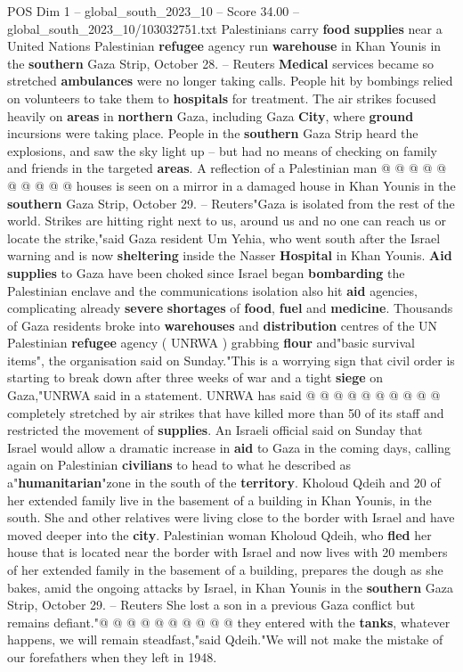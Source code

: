 \begin{textsample}{POS Dim 1 – global\_south\_2023\_10 – Score 34.00 – global\_south\_2023\_10/103032751.txt}
Palestinians carry \textbf{food} \textbf{supplies} near a United Nations Palestinian \textbf{refugee} agency run \textbf{warehouse} in Khan Younis in the \textbf{southern} Gaza Strip, October 28. -- Reuters \textbf{Medical} services became so stretched \textbf{ambulances} were no longer taking calls.
People hit by bombings relied on volunteers to take them to \textbf{hospitals} for treatment.
The air strikes focused heavily on \textbf{areas} in \textbf{northern} Gaza, including Gaza \textbf{City}, where \textbf{ground} incursions were taking place.
People in the \textbf{southern} Gaza Strip heard the explosions, and saw the sky light up -- but had no means of checking on family and friends in the targeted \textbf{areas}.
A reflection of a Palestinian man @ @ @ @ @ @ @ @ @ @ houses is seen on a mirror in a damaged house in Khan Younis in the \textbf{southern} Gaza Strip, October 29. -- Reuters"Gaza is isolated from the rest of the world.
Strikes are hitting right next to us, around us and no one can reach us or locate the strike,"said Gaza resident Um Yehia, who went south after the Israel warning and is now \textbf{sheltering} inside the Nasser \textbf{Hospital} in Khan Younis. \textbf{Aid} \textbf{supplies} to Gaza have been choked since Israel began \textbf{bombarding} the Palestinian enclave and the communications isolation also hit \textbf{aid} agencies, complicating already \textbf{severe} \textbf{shortages} of \textbf{food}, \textbf{fuel} and \textbf{medicine}.
Thousands of Gaza residents broke into \textbf{warehouses} and \textbf{distribution} centres of the UN Palestinian \textbf{refugee} agency ( UNRWA ) grabbing \textbf{flour} and"basic survival items", the organisation said on Sunday."This is a worrying sign that civil order is starting to break down after three weeks of war and a tight \textbf{siege} on Gaza,"UNRWA said in a statement.
UNRWA has said @ @ @ @ @ @ @ @ @ @ completely stretched by air strikes that have killed more than 50 of its staff and restricted the movement of \textbf{supplies}.
An Israeli official said on Sunday that Israel would allow a dramatic increase in \textbf{aid} to Gaza in the coming days, calling again on Palestinian \textbf{civilians} to head to what he described as a"\textbf{humanitarian}"zone in the south of the \textbf{territory}.
Kholoud Qdeih and 20 of her extended family live in the basement of a building in Khan Younis, in the south.
She and other relatives were living close to the border with Israel and have moved deeper into the \textbf{city}.
Palestinian woman Kholoud Qdeih, who \textbf{fled} her house that is located near the border with Israel and now lives with 20 members of her extended family in the basement of a building, prepares the dough as she bakes, amid the ongoing attacks by Israel, in Khan Younis in the \textbf{southern} Gaza Strip, October 29. -- Reuters She lost a son in a previous Gaza conflict but remains defiant."@ @ @ @ @ @ @ @ @ @ they entered with the \textbf{tanks}, whatever happens, we will remain steadfast,"said Qdeih."We will not make the mistake of our forefathers when they left in 1948.

\end{textsample}
